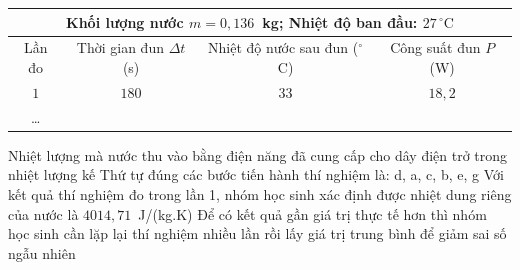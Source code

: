 \begin{ex}
\begin{center}
\begin{tikzpicture}[x=0.0033cm,y=-0.0033cm,line join=round,line cap=round,font=\footnotesize]
			\end{tikzpicture}
		\end{center}
		\begin{center}
			\small\renewcommand{\arraystretch}{1.1}\setlength{\tabcolsep}{5pt}
			\begin{tabular}{|c|c|c|c|}
				\hline
				\multicolumn{4}{|c|}{Khối lượng nước $m=0{,}136$~kg; Nhiệt độ ban đầu: $27\,^\circ\text{C}$}\\
				\hline
				Lần đo & Thời gian đun $\Delta t$ (s) & Nhiệt độ nước sau đun ($^\circ$C) & Công suất đun $P$ (W)\\
				\hline
				$1$ & $180$ & $33$ & $18{,}2$\\
				\hline
				\dots & & & \\
				\hline
			\end{tabular}
		\end{center}
		\choiceTFt
		{\True Nhiệt lượng mà nước thu vào bằng điện năng đã cung cấp cho dây điện trở trong nhiệt lượng kế}
		{Thứ tự đúng các bước tiến hành thí nghiệm là: d, a, c, b, e, g}
		{\True Với kết quả thí nghiệm đo trong lần 1, nhóm học sinh xác định được nhiệt dung riêng của nước là $4014{,}71$~J/(kg.K)}
		{\True Để có kết quả gần giá trị thực tế hơn thì nhóm học sinh cần lặp lại thí nghiệm nhiều lần rồi lấy giá trị trung bình để giảm sai số ngẫu nhiên}
	\end{ex}

